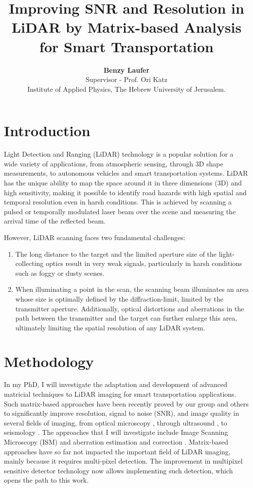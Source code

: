 \documentclass{article}
\title{\textbf{\Large Improving SNR and Resolution in LiDAR by Matrix-based Analysis for Smart Transportation}}
\author{
    \textbf{Benzy Laufer} \\  Supervisor - Prof. Ori Katz \\
    Institute of Applied Physics, The Hebrew University of Jerusalem. 
}
\begin{document}
\date{}

\maketitle

\vspace{-0.5em}
\section{Introduction}
\large Light Detection and Ranging (LiDAR) technology is a popular solution for a wide variety of applications, from atmospheric sensing, through 3D shape measurements, to autonomous vehicles and smart transportation systems. LiDAR has the unique ability to map the space around it in three dimensions (3D) and high sensitivity, making it possible to identify road hazards with high spatial and temporal resolution even in harsh conditions. This is achieved by scanning a pulsed or temporally modulated laser beam over the scene and measuring the arrival time of the reflected beam.

However, LiDAR scanning faces two fundamental challenges:
\begin{enumerate}
    \item The long distance to the target and the limited aperture size of the light-collecting optics result in very weak signals, particularly in harsh conditions such as foggy or dusty scenes.
    \item When illuminating a point in the scan, the scanning beam illuminates an area whose size is optimally defined by the diffraction-limit, limited by the transmitter aperture. Additionally, optical distortions and aberrations in the path between the transmitter and the target can further enlarge this area, ultimately limiting the spatial resolution of any LiDAR system.
\end{enumerate}

\vspace{-0.5em}
\section{Methodology}
In my PhD, I will investigate the adaptation and development of advanced matricial techniques to LiDAR imaging for smart transportation applications. Such matrix-based approaches have been recently proved by our group and others to significantly improve resolution, signal to noise (SNR), and image quality in several fields of imaging, from optical microscopy \cite{Badon2020}, through ultrasound \cite{PhysRevX.10.021048}, to seismology \cite{2018JB016361}. The approaches that I will investigate include Image Scanning Microscopy (ISM) \cite{muller} and aberration estimation and correction \cite{Badon2020}. Matrix-based approaches have so far not impacted the important field of LiDAR imaging, mainly because it requires multi-pixel detection. The improvement in multipixel sensitive detector technology now allows implementing such detection, which opens the path to this work.
\end{document}

